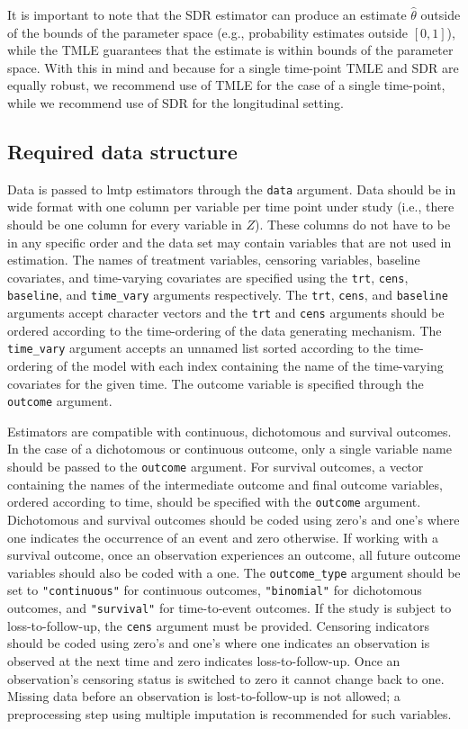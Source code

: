 \documentclass[twoside,11pt]{article}
\newcommand{\pkg}[1]{{\fontseries{b}\selectfont #1}}
\let\code=\texttt
\begin{document}
It is important to note that the SDR estimator can produce an estimate $\hat{\theta}$ outside of the bounds of the parameter space (e.g., probability estimates outside $[0,1]$), while the TMLE guarantees that the estimate is within bounds of the parameter space. With this in mind and because for a single time-point TMLE and SDR are equally robust, we recommend use of TMLE for the case of a single time-point, while we recommend use of SDR for the longitudinal setting.

\hypertarget{required-data-structure}{\subsection{Required data structure}\label{required-data-structure}}

Data is passed to \pkg{lmtp} estimators through the \code{data} argument. Data should be in wide format with one column per variable per time point under study (i.e., there should be one column for every variable in $Z$). These columns do not have to be in any specific order and the data set may contain variables that are not used in estimation. The names of treatment variables, censoring variables, baseline covariates, and time-varying covariates are specified using the \code{trt}, \code{cens}, \code{baseline}, and \code{time\_vary} arguments respectively. The \code{trt}, \code{cens}, and \code{baseline} arguments accept character vectors and the \code{trt} and \code{cens} arguments should be ordered according to the time-ordering of the data generating mechanism. The \code{time\_vary} argument accepts an unnamed list sorted according to the time-ordering of the model with each index containing the name of the time-varying covariates for the given time. The outcome variable is specified through the \code{outcome} argument.

Estimators are compatible with continuous, dichotomous and survival outcomes. In the case of a dichotomous or continuous outcome, only a single variable name should be passed to the \code{outcome} argument. For survival outcomes, a vector containing the names of the intermediate outcome and final outcome variables, ordered according to time, should be specified with the \code{outcome} argument. Dichotomous and survival outcomes should be coded using zero's and one's where one indicates the occurrence of an event and zero otherwise. If working with a survival outcome, once an observation experiences an outcome, all future outcome variables should also be coded with a one. The \code{outcome\_type} argument should be set to \code{"continuous"} for continuous outcomes, \code{"binomial"} for dichotomous outcomes, and \code{"survival"} for time-to-event outcomes. If the study is subject to loss-to-follow-up, the \code{cens} argument must be provided. Censoring indicators should be coded using zero's and one's where one indicates an observation is observed at the next time and zero indicates loss-to-follow-up. Once an observation's censoring status is switched to zero it cannot change back to one. Missing data before an observation is lost-to-follow-up is not allowed; a preprocessing step using multiple imputation is recommended for such variables.
\end{document}
